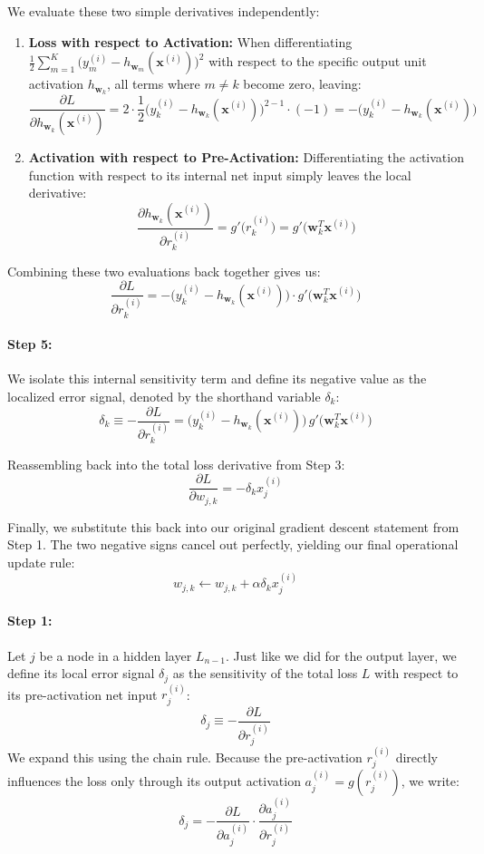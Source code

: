 We evaluate these two simple derivatives independently:
\begin{enumerate}
    \item \textbf{Loss with respect to Activation:} When differentiating $\frac{1}{2}\sum_{m=1}^K \big(y_m^{(i)} - h_{\mathbf{w}_m}(\mathbf{x}^{(i)})\big)^2$ with respect to the specific output unit activation $h_{\mathbf{w}_k}$, all terms where $m \neq k$ become zero, leaving:
    \[
    \frac{\partial L}{\partial h_{\mathbf{w}_k}(\mathbf{x}^{(i)})} = 2 \cdot \frac{1}{2} \big(y_k^{(i)} - h_{\mathbf{w}_k}(\mathbf{x}^{(i)})\big)^{2-1} \cdot (-1) = -\big(y_k^{(i)} - h_{\mathbf{w}_k}(\mathbf{x}^{(i)})\big)
    \]
    \item \textbf{Activation with respect to Pre-Activation:} Differentiating the activation function with respect to its internal net input simply leaves the local derivative:
    \[
    \frac{\partial h_{\mathbf{w}_k}(\mathbf{x}^{(i)})}{\partial r_k^{(i)}} = g'\big(r_k^{(i)}\big) = g'\big(\mathbf{w}_k^T\mathbf{x}^{(i)}\big)
    \]
\end{enumerate}

Combining these two evaluations back together gives us:
\[
\frac{\partial L}{\partial r_k^{(i)}} = -\big(y_k^{(i)} - h_{\mathbf{w}_k}(\mathbf{x}^{(i)})\big) \cdot g'\big(\mathbf{w}_k^T\mathbf{x}^{(i)}\big)
\]

\paragraph{Step 5:}
We isolate this internal sensitivity term and define its negative value as the localized error signal, denoted by the shorthand variable $\delta_k$:
\[
\delta_k \equiv -\frac{\partial L}{\partial r_k^{(i)}} = \big(y_k^{(i)} - h_{\mathbf{w}_k}(\mathbf{x}^{(i)})\big)\, g'\big(\mathbf{w}_k^T\mathbf{x}^{(i)}\big)
\]

Reassembling back into the total loss derivative from Step 3:
\[
\frac{\partial L}{\partial w_{j,k}} = -\delta_k x_j^{(i)}
\]

Finally, we substitute this back into our original gradient descent statement from Step 1. The two negative signs cancel out perfectly, yielding our final operational update rule:
\[
w_{j,k} \leftarrow w_{j,k} + \alpha \delta_k x_j^{(i)}
\]



\paragraph{Step 1:}
Let $j$ be a node in a hidden layer $L_{n-1}$. Just like we did for the output layer, we define its local error signal $\delta_j$ as the sensitivity of the total loss $L$ with respect to its pre-activation net input $r_j^{(i)}$:
\[
\delta_j \equiv -\frac{\partial L}{\partial r_j^{(i)}}
\]
We expand this using the chain rule. Because the pre-activation $r_j^{(i)}$ directly influences the loss only through its output activation $a_j^{(i)} = g(r_j^{(i)})$, we write:
\[
\delta_j = -\frac{\partial L}{\partial a_j^{(i)}} \cdot \frac{\partial a_j^{(i)}}{\partial r_j^{(i)}}
\]

